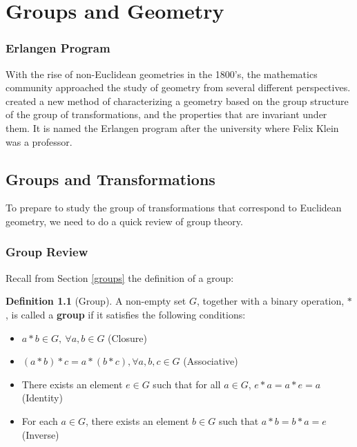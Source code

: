 \documentclass[
]{book}
\providecommand{\tightlist}{%
  \setlength{\itemsep}{0pt}\setlength{\parskip}{0pt}}
\theoremstyle{definition}
\newtheorem{definition}{Definition}[chapter]
\theoremstyle{definition}
\theoremstyle{definition}
\theoremstyle{definition}
\theoremstyle{remark}
\begin{document}
\hypertarget{algebraic-geometry}{%
\chapter{Groups and Geometry}\label{algebraic-geometry}}

\hypertarget{erlangen-program}{%
\subsection*{Erlangen Program}\label{erlangen-program}}

With the rise of non-Euclidean geometries in the 1800's, the mathematics community approached the study of geometry from several different perspectives. \citet{Klein1872} created a new method of characterizing a geometry based on the group structure of the group of transformations, and the properties that are invariant under them. It is named the Erlangen program after the university where Felix Klein was a professor.

\hypertarget{groups-and-transformations}{%
\section{Groups and Transformations}\label{groups-and-transformations}}

To prepare to study the group of transformations that correspond to Euclidean geometry, we need to do a quick review of group theory.

\hypertarget{group-review}{%
\subsection{Group Review}\label{group-review}}

Recall from Section \ref{groups} the definition of a group:

\begin{definition}[Group]

A non-empty set \(G\), together with a binary operation, \(*\), is called a \textbf{group} if it satisfies the following conditions:

\begin{itemize}
\tightlist
\item
  \(a*b \in G, \: \forall a,b \in G\) (Closure)
\item
  \((a*b)*c = a * (b*c), \forall a,b,c \in G\) (Associative)
\item
  There exists an element \(e \in G\) such that for all \(a\in G\), \(e*a=a*e=a\) (Identity)
\item
  For each \(a\in G\), there exists an element \(b\in G\) such that \(a*b=b*a=e\) (Inverse)
\end{itemize}

\end{definition}
\end{document}
